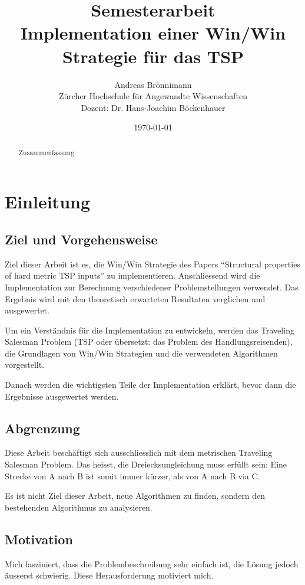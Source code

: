 \documentclass[11pt,a4paper]{article}
\title {Semesterarbeit\\
Implementation einer Win/Win Strategie für das TSP\\}
\author {Andreas Brönnimann\\
Zürcher Hochschule für Angewandte Wissenschaften\\
Dozent: Dr. Hans-Joachim Böckenhauer}
\date {\today}
\begin{document}
\nocite{*}

\maketitle
\setcounter{page}{0}
\thispagestyle{empty}
\newpage

\begin{abstract}
    Zusammenfassung
\end{abstract}

\newpage

\tableofcontents
\newpage
\section{Einleitung}
\subsection{Ziel und Vorgehensweise}
Ziel dieser Arbeit ist es, die Win/Win Strategie des Papers "`Structural properties of hard metric TSP inputs"'\cite{moemke11} zu implementieren. Anschliessend wird die Implementation zur Berechnung verschiedener Problemstellungen verwendet. Das Ergebnis wird mit den theoretisch erwarteten Resultaten verglichen und ausgewertet.

Um ein Verständnis für die Implementation zu entwickeln, werden das Traveling Salesman Problem (TSP oder übersetzt: das Problem des Handlungsreisenden), die Grundlagen von Win/Win Strategien und die verwendeten Algorithmen vorgestellt. 

Danach werden die wichtigsten Teile der Implementation erklärt, bevor dann die Ergebnisse ausgewertet werden. 

\subsection{Abgrenzung}
Diese Arbeit beschäftigt sich ausschliesslich mit dem metrischen Traveling Salesman Problem. Das heisst, die Dreiecksungleichung muss erfüllt sein: Eine Strecke von A nach B ist somit immer kürzer, als von A nach B via C. 

Es ist nicht Ziel dieser Arbeit, neue Algorithmen zu finden, sondern den bestehenden Algorithmus zu analysieren.

\subsection{Motivation}
Mich fasziniert, dass die Problembeschreibung sehr einfach ist, die Lösung jedoch äusserst schwierig. Diese Herausforderung motiviert mich.
\end{document}
